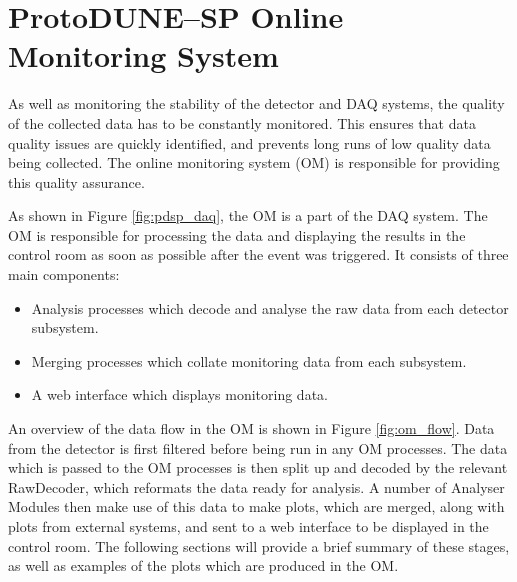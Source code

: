 \section{ProtoDUNE--SP Online Monitoring System} \label{sec:pdsp_om}

As well as monitoring the stability of the detector and DAQ systems, the quality
of the collected data has to be constantly monitored. This ensures that data
quality issues are quickly identified, and prevents long runs of low quality
data being collected. The online monitoring system (OM) is responsible for 
providing this quality assurance.

As shown in Figure \ref{fig:pdsp_daq}, the OM is a part of the \protodune{} DAQ
system. The OM is responsible for processing the data and displaying
the results in the control room as soon as possible after the event was 
triggered. It consists of three main components:
\begin{itemize}
	\item Analysis processes which decode and analyse the raw data from each 
		detector subsystem.
	\item Merging processes which collate monitoring data from each subsystem.
	\item A web interface which displays monitoring data.
\end{itemize}

\noindent
An overview of the data flow in the OM is shown in Figure \ref{fig:om_flow}. 
Data from the detector is first filtered before being run in any OM processes. 
The data which is passed to the OM processes is then split up and decoded by 
the relevant RawDecoder, which reformats the data ready for analysis. A 
number of Analyser Modules then make use of this data to make plots, 
which are merged, along with plots from external systems, and sent to a web 
interface to be displayed in the control room. The following sections will 
provide a brief summary of these stages, as well as examples of the plots 
which are produced in the OM.

